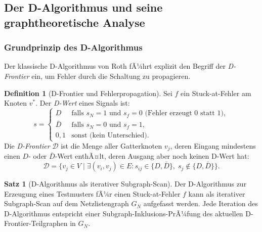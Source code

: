 ﻿\documentclass[a4paper,12pt]{article}
\theoremstyle{definition}
\newtheorem{definition}{Definition}
\newtheorem{satz}{Satz}
\begin{document}
\subsection{Der D-Algorithmus und seine graphtheoretische Analyse}

\subsubsection{Grundprinzip des D-Algorithmus}

Der klassische D-Algorithmus von Roth \cite[S.~823]{ciletti2011} fÃ¼hrt explizit den
Begriff der \emph{D-Frontier} ein, um Fehler durch die Schaltung zu propagieren.

\begin{definition}[D-Frontier und Fehlerpropagation]\label{def:dfrontier}
  Sei $f$ ein Stuck-at-Fehler am Knoten $v^*$. Der \emph{D-Wert} eines Signals ist:
  \[
    s = \begin{cases}
      D   & \text{falls } s_N = 1 \text{ und } s_f = 0 \text{ (Fehler erzeugt 0 statt 1)}, \\
      \bar{D} & \text{falls } s_N = 0 \text{ und } s_f = 1,\\
      0, 1 & \text{sonst (kein Unterschied)}.
    \end{cases}
  \]
  Die \emph{D-Frontier} $\mathcal{D}$ ist die Menge aller Gatterknoten $v_j$, deren
  Eingang mindestens einen $D$- oder $\bar{D}$-Wert enthÃ¤lt, deren Ausgang aber noch
  keinen D-Wert hat:
  \[
    \mathcal{D} = \bigl\{v_j \in V \;\big|\;
    \exists (v_i, v_j) \in E: s_{ij} \in \{D, \bar{D}\},\;
    s_j \notin \{D, \bar{D}\}\bigr\}.
  \]
\end{definition}

\begin{satz}[D-Algorithmus als iterativer Subgraph-Scan]\label{satz:dalgo}
  Der D-Algorithmus \cite[S.~823--829]{ciletti2011} zur Erzeugung eines Testmusters fÃ¼r
  einen Stuck-at-Fehler $f$ kann als iterativer Subgraph-Scan auf dem Netzlistengraph
  $G_N$ aufgefasst werden. Jede Iteration des D-Algorithmus entspricht einer
  Subgraph-Inklusions-PrÃ¼fung des aktuellen D-Frontier-Teilgraphen in $G_N$.
\end{satz}
\end{document}
